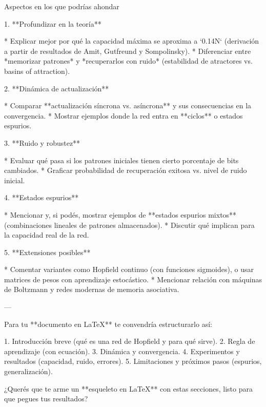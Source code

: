 \documentclass[11pt]{article} %
\begin{document}
Aspectos en los que podrías ahondar

1. **Profundizar en la teoría**

   * Explicar mejor por qué la capacidad máxima se aproxima a `0.14N` (derivación a partir de resultados de Amit, Gutfreund y Sompolinsky).
   * Diferenciar entre *memorizar patrones* y *recuperarlos con ruido* (estabilidad de atractores vs. basins of attraction).

2. **Dinámica de actualización**

   * Comparar **actualización síncrona vs. asíncrona** y sus consecuencias en la convergencia.
   * Mostrar ejemplos donde la red entra en **ciclos** o estados espurios.

3. **Ruido y robustez**

   * Evaluar qué pasa si los patrones iniciales tienen cierto porcentaje de bits cambiados.
   * Graficar probabilidad de recuperación exitosa vs. nivel de ruido inicial.

4. **Estados espurios**

   * Mencionar y, si podés, mostrar ejemplos de **estados espurios mixtos** (combinaciones lineales de patrones almacenados).
   * Discutir qué implican para la capacidad real de la red.

5. **Extensiones posibles**

   * Comentar variantes como Hopfield continuo (con funciones sigmoides), o usar matrices de pesos con aprendizaje estocástico.
   * Mencionar relación con máquinas de Boltzmann y redes modernas de memoria asociativa.

---

Para tu **documento en LaTeX** te convendría estructurarlo así:

1. Introducción breve (qué es una red de Hopfield y para qué sirve).
2. Regla de aprendizaje (con ecuación).
3. Dinámica y convergencia.
4. Experimentos y resultados (capacidad, ruido, errores).
5. Limitaciones y próximos pasos (espurios, generalización).

¿Querés que te arme un **esqueleto en LaTeX** con estas secciones, listo para que pegues tus resultados?
\end{document}
